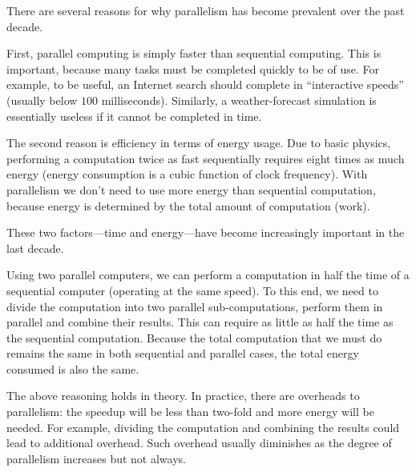 



\begin{gram}
There are several reasons for why parallelism has become prevalent
over the past decade.
%

First, parallel computing is simply faster than sequential computing.
%
This is important, because many tasks must be completed quickly to be
of use. 
%
For example, to be useful, an Internet search should complete in
``interactive speeds'' (usually below $100$ milliseconds).
%
Similarly, a weather-forecast simulation is essentially useless if it
cannot be completed in time.

The second reason is efficiency in terms of energy usage.
%
Due to basic physics, performing a computation twice as fast
sequentially requires eight times as much energy (energy consumption is a cubic function of clock frequency). 
%
With parallelism we don't need to use more energy than sequential
computation, because energy is determined by the total amount of
computation (work).
%

These two factors---time and energy---have become increasingly
important in the last decade.
\end{gram}

\begin{example}
Using two parallel computers, we can perform a computation in half the
time of a sequential computer (operating at the same speed).
%
To this end, we need to divide the computation into two parallel
sub-computations, perform them in parallel and combine their results.
%
This can require as little as half the time as the sequential
computation.
%
Because the total computation that we must do remains the same in both
sequential and parallel cases, the total energy consumed is also the same.
%

The above reasoning holds in theory.
%
In practice, there are overheads to parallelism: the speedup will be
less than two-fold and more energy will be needed.
%
For example, dividing the computation and combining the results could
lead to additional overhead.  
%
Such overhead usually diminishes as the degree of parallelism
increases but not always.

\end{example}

